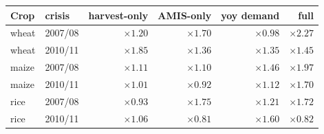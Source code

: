 \begin{tabular}{l l rrrr}
\toprule
Crop & crisis & harvest-only & AMIS-only & yoy demand & full \\
\midrule
wheat & 2007/08 & $\times 1.20$ & $\times 1.70$ & $\times 0.98$ & $\times 2.27$ \\
wheat & 2010/11 & $\times 1.85$ & $\times 1.36$ & $\times 1.35$ & $\times 1.45$ \\
maize & 2007/08 & $\times 1.11$ & $\times 1.10$ & $\times 1.46$ & $\times 1.97$ \\
maize & 2010/11 & $\times 1.01$ & $\times 0.92$ & $\times 1.12$ & $\times 1.70$ \\
rice  & 2007/08 & $\times 0.93$ & $\times 1.75$ & $\times 1.21$ & $\times 1.72$ \\
rice  & 2010/11 & $\times 1.06$ & $\times 0.81$ & $\times 1.60$ & $\times 0.82$ \\
\bottomrule
\end{tabular}
